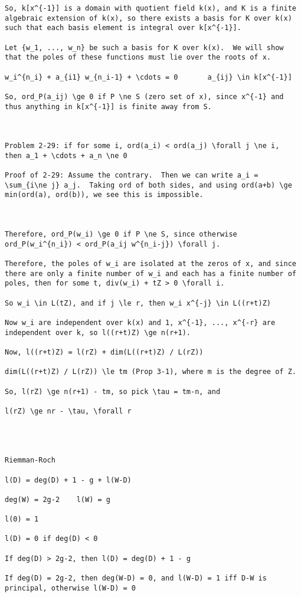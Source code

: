 {\begin{verbatim}
So, k[x^{-1}] is a domain with quotient field k(x), and K is a finite
algebraic extension of k(x), so there exists a basis for K over k(x)
such that each basis element is integral over k[x^{-1}].

Let {w_1, ..., w_n} be such a basis for K over k(x).  We will show
that the poles of these functions must lie over the roots of x.

w_i^{n_i} + a_{i1} w_{n_i-1} + \cdots = 0       a_{ij} \in k[x^{-1}]

So, ord_P(a_ij) \ge 0 if P \ne S (zero set of x), since x^{-1} and
thus anything in k[x^{-1}] is finite away from S.



Problem 2-29: if for some i, ord(a_i) < ord(a_j) \forall j \ne i,
then a_1 + \cdots + a_n \ne 0

Proof of 2-29: Assume the contrary.  Then we can write a_i =
\sum_{i\ne j} a_j.  Taking ord of both sides, and using ord(a+b) \ge
min(ord(a), ord(b)), we see this is impossible.



Therefore, ord_P(w_i) \ge 0 if P \ne S, since otherwise
ord_P(w_i^{n_i}) < ord_P(a_ij w^{n_i-j}) \forall j.

Therefore, the poles of w_i are isolated at the zeros of x, and since
there are only a finite number of w_i and each has a finite number of
poles, then for some t, div(w_i) + tZ > 0 \forall i.

So w_i \in L(tZ), and if j \le r, then w_i x^{-j} \in L((r+t)Z)

Now w_i are independent over k(x) and 1, x^{-1}, ..., x^{-r} are
independent over k, so l((r+t)Z) \ge n(r+1).

Now, l((r+t)Z) = l(rZ) + dim(L((r+t)Z) / L(rZ))

dim(L((r+t)Z) / L(rZ)) \le tm (Prop 3-1), where m is the degree of Z.

So, l(rZ) \ge n(r+1) - tm, so pick \tau = tm-n, and

l(rZ) \ge nr - \tau, \forall r




Riemman-Roch

l(D) = deg(D) + 1 - g + l(W-D)

deg(W) = 2g-2    l(W) = g

l(0) = 1

l(D) = 0 if deg(D) < 0

If deg(D) > 2g-2, then l(D) = deg(D) + 1 - g

If deg(D) = 2g-2, then deg(W-D) = 0, and l(W-D) = 1 iff D-W is principal, otherwise l(W-D) = 0


\end{verbatim}}
